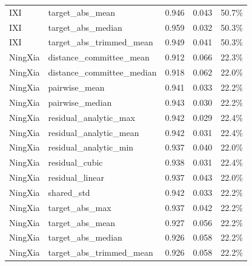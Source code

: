 \begin{tabular}{llrrr}
IXI & target\_abs\_mean & 0.946 & 0.043 & 50.7\% \\
IXI & target\_abs\_median & 0.959 & 0.032 & 50.3\% \\
IXI & target\_abs\_trimmed\_mean & 0.949 & 0.041 & 50.3\% \\
NingXia & distance\_committee\_mean & 0.912 & 0.066 & 22.3\% \\
NingXia & distance\_committee\_median & 0.918 & 0.062 & 22.0\% \\
NingXia & pairwise\_mean & 0.941 & 0.033 & 22.2\% \\
NingXia & pairwise\_median & 0.943 & 0.030 & 22.2\% \\
NingXia & residual\_analytic\_max & 0.942 & 0.029 & 22.4\% \\
NingXia & residual\_analytic\_mean & 0.942 & 0.031 & 22.4\% \\
NingXia & residual\_analytic\_min & 0.937 & 0.040 & 22.0\% \\
NingXia & residual\_cubic & 0.938 & 0.031 & 22.4\% \\
NingXia & residual\_linear & 0.937 & 0.043 & 22.0\% \\
NingXia & shared\_std & 0.942 & 0.033 & 22.2\% \\
NingXia & target\_abs\_max & 0.937 & 0.042 & 22.2\% \\
NingXia & target\_abs\_mean & 0.927 & 0.056 & 22.2\% \\
NingXia & target\_abs\_median & 0.926 & 0.058 & 22.2\% \\
NingXia & target\_abs\_trimmed\_mean & 0.926 & 0.058 & 22.2\% \\
\bottomrule
\end{tabular}
